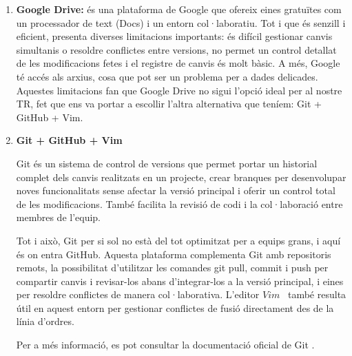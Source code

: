 \begin{enumerate}
\clearpage
 \item \textbf{Google Drive: }és una plataforma de Google que ofereix eines gratuïtes com un processador de text (Docs) i un entorn col·laboratiu. Tot i que és senzill i eficient, presenta diverses limitacions importants: és difícil gestionar canvis simultanis o resoldre conflictes entre versions, no permet un control detallat de les modificacions fetes i el registre de canvis és molt bàsic. A més, Google té accés als arxius, cosa que pot ser un problema per a dades delicades. Aquestes limitacions fan que Google Drive no sigui l’opció ideal per al nostre TR, fet que ens va portar a escollir l’altra alternativa que teníem: Git + GitHub + Vim.

\item \textbf{Git + GitHub + Vim}

Git és un sistema de control de versions \cite{ControlDeVersions} que permet portar un historial complet dels canvis realitzats en un projecte, crear branques per desenvolupar noves funcionalitats sense afectar la versió principal i oferir un control total de les modificacions. També facilita la revisió de codi i la col·laboració entre membres de l’equip.

Tot i això, Git per si sol no està del tot optimitzat per a equips grans, i aquí és on entra GitHub. Aquesta plataforma complementa Git amb repositoris remots, la possibilitat d’utilitzar les comandes git pull, commit i push per compartir canvis i revisar-los abans d’integrar-los a la versió principal, i eines per resoldre conflictes de manera col·laborativa. L’editor $Vim$~\cite{Vim} també resulta útil en aquest entorn per gestionar conflictes de fusió directament des de la línia d’ordres.\\

Per a més informació, es pot consultar la documentació oficial de Git \cite{PaginaoficialdelGit}.
\end{enumerate}

